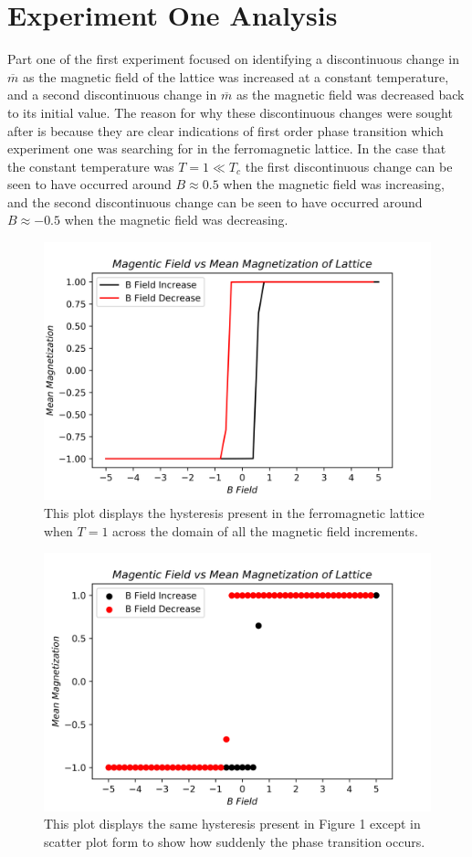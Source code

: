 \documentclass[twocolumn]{article}
\begin{document}
\section{Experiment One Analysis}
\hspace{\parindent} Part one of the first experiment focused on identifying a discontinuous change in $\overline{m}$ as the magnetic field of the lattice was increased at a constant temperature, and a second discontinuous change in $\overline{m}$ as the magnetic field was decreased back to its initial value. The reason for why these discontinuous changes were sought after is because they are clear indications of first order phase transition which experiment one was searching for in the ferromagnetic lattice. In the case that the constant temperature was $T=1 \ll T_c$ the first discontinuous change can be seen to have occurred around $B\approx 0.5$ when the magnetic field was increasing, and the second discontinuous change can be seen to have occurred around $B\approx -0.5$ when the magnetic field was decreasing. 
\begin{figure}[h]
\caption{This plot displays the hysteresis present in the ferromagnetic lattice when $T=1$ across the domain of all the magnetic field increments.}
\centering
\includegraphics[scale=.5]{FirstOrderPhaseT=1Plot}
\end{figure}
\begin{figure}[h]
\caption{This plot displays the same hysteresis present in Figure 1 except in scatter plot form to show how suddenly the phase transition occurs.}
\centering
\includegraphics[scale=.5]{FirstOrderPhaseT=1Scatter}
\end{figure}
\end{document}
